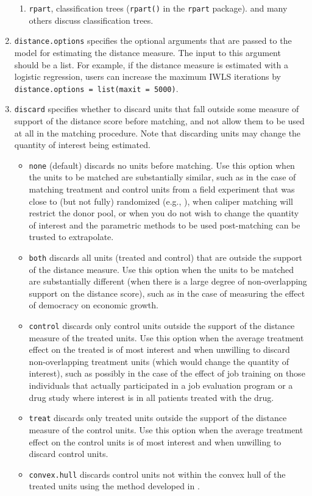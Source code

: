 \documentclass[oneside,letterpaper,titlepage]{article}
\begin{document}
\begin{enumerate}
\begin{enumerate}
  \item \texttt{rpart}, classification trees ({\tt rpart()} in the
    \texttt{rpart} package). \citet{BreFriOls84,RugKimMar03} and many
    others discuss classification trees.
  \end{enumerate}
  
\item \texttt{distance.options} specifies the optional arguments that
  are passed to the model for estimating the distance measure. The
  input to this argument should be a list.  For example, if the
  distance measure is estimated with a logistic regression, users can
  increase the maximum IWLS iterations by \texttt{distance.options =
    list(maxit = 5000)}.

\item \texttt{discard} specifies whether to discard units that fall
  outside some measure of support of the distance score before
  matching, and not allow them to be used at all in the matching
  procedure.  Note that discarding units may change the quantity of
  interest being estimated.
  \begin{itemize}
  \item \texttt{none} (default) discards no units before matching.
    Use this option when the units to be matched are substantially
    similar, such as in the case of matching treatment and control
    units from a field experiment that was close to (but not fully)
    randomized (e.g., \citealt{Imai05}), when caliper matching will
    restrict the donor pool, or when you do not wish to change the
    quantity of interest and the parametric methods to be used
    post-matching can be trusted to extrapolate.
  \item \texttt{both} discards all units (treated and control) that
    are outside the support of the distance measure. Use this option
    when the units to be matched are substantially different (when
    there is a large degree of non-overlapping support on the distance
    score), such as in the case of measuring the effect of democracy
    on economic growth.
  \item \texttt{control} discards only control units outside the
    support of the distance measure of the treated units.  Use this
    option when the average treatment effect on the treated is of most
    interest and when unwilling to discard non-overlapping treatment
    units (which would change the quantity of interest), such as
    possibly in the case of the effect of job training on those
    individuals that actually participated in a job evaluation program
    or a drug study where interest is in all patients treated with the
    drug.
  \item \texttt{treat} discards only treated units outside the support
    of the distance measure of the control units.  Use this option
    when the average treatment effect on the control units is of most
    interest and when unwilling to discard control units.
  \item \texttt{convex.hull} discards control units not within the
    convex hull of the treated units using the method developed in
    \citep{KinZen04}.
  \end{itemize}
  

\end{enumerate}
\end{document}

